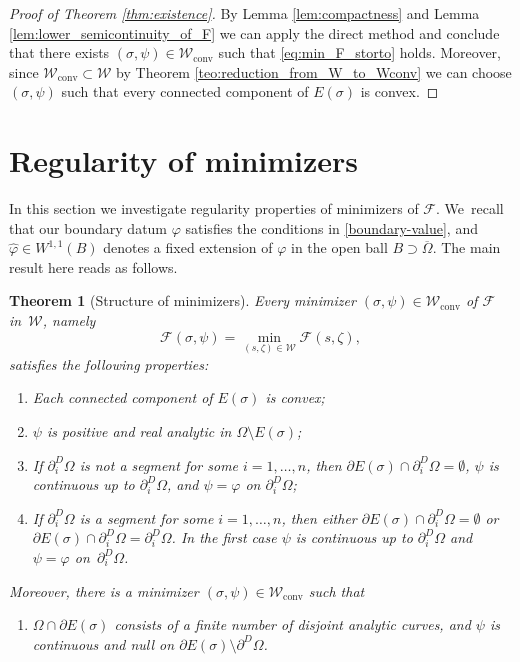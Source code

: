 \documentclass[11pt]{article}
\numberwithin{equation}{section}
\newcommand{\largercomp}{\mathcal W}
\let\Om\Omega
\newcommand\admclassconv{{\mathcal W_\mathrm{conv}}}
\newtheorem{theorem}{Theorem}[section]
\theoremstyle{definition}
\begin{document}
\begin{proof}[Proof of Theorem \ref{thm:existence}]
By Lemma \ref{lem:compactness} and Lemma \ref{lem:lower_semicontinuity_of_F} we can apply the direct method and conclude that there exists $(\sigma, \psi)\in\admclassconv$ such that
\eqref{eq:min_F_storto} holds. Moreover, since $\admclassconv\subset\largercomp$ by Theorem \eqref{teo:reduction_from_W_to_Wconv} we can choose $(\sigma,\psi)$ such that every connected component of $E(\sigma)$ is convex.
\end{proof}

\section{Regularity of minimizers}
\label{sec:regularity_of_minimizers}

In this section we investigate regularity properties of
minimizers of $\mathcal F$. We~recall that our boundary datum
$\varphi$
satisfies the conditions
in \eqref{boundary-value}, and $\widehat\varphi\in W^{1,1}(B)$ denotes a
fixed extension of $\varphi$ in the open ball $B\supset\overline\Omega$.
The main result here reads as follows.
\begin{theorem}[Structure of minimizers]
\label{teo:structure_of_minimizers}
Every minimizer $(\sigma,\psi)\in\admclassconv$ of $\mathcal F$ in~$\largercomp$, namely
\begin{equation*}
{\mathcal{F}}(\sigma,\psi)=\min_{(s,\zeta)\in\largercomp}
{\mathcal{F}}(s,\zeta),
\end{equation*}
satisfies the following properties:
\begin{enumerate}[{\rm(1)},wide]
\item\label{1.}
Each connected component of $E(\sigma)$ is convex;
\item\label{2.} $\psi$ is positive and real analytic
in $\Om\setminus E(\sigma)$;
\item\label{3.} If $\partial^D_i\Om$ is not
a segment
for some $i=1,\dots,n$, then $\partial E(\sigma)\cap
\partial_i^D\Om=\emptyset$, $\psi$ is continuous up to $\partial_i^D\Om$, and
$\psi=\varphi$ on $\partial_i^D\Om$;
\item\label{4.} If $\partial^D_i\Om$ is a segment for some $i=1,\dots,n$, then either $\partial E(\sigma)\cap
\partial_i^D\Om=\emptyset$ or $\partial E(\sigma)\cap
\partial_i^D\Om=\partial_i^D\Om$. In the first case $\psi$
is continuous up to $\partial_i^D\Om$ and
$\psi=\varphi$ on~$\partial_i^D\Om$.
\end{enumerate}
Moreover, there is a minimizer $(\sigma,\psi)\in\admclassconv$ such that
\begin{enumerate}[{\rm(5)},wide]
\item\label{5.}
$\Om\cap \partial E(\sigma)$ consists of a finite number of disjoint analytic curves, and $\psi$ is continuous and null on $\partial E(\sigma)\setminus \partial^D\Omega$.
\end{enumerate}
\end{theorem}
\end{document}
